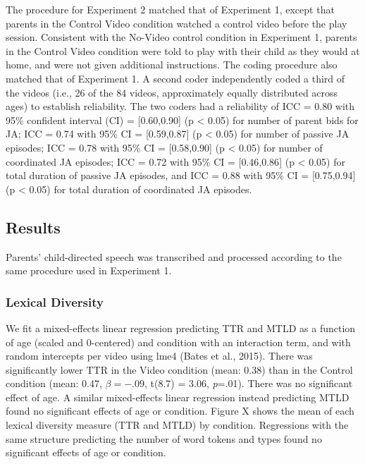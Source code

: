 \documentclass[]{article}
\begin{document}
The procedure for Experiment 2 matched that of Experiment 1, except that
parents in the Control Video condition watched a control video before
the play session. Consistent with the No-Video control condition in
Experiment 1, parents in the Control Video condition were told to play
with their child as they would at home, and were not given additional
instructions. The coding procedure also matched that of Experiment 1. A
second coder independently coded a third of the videos (i.e., 26 of the
84 videos, approximately equally distributed across ages) to establish
reliability. The two coders had a reliability of ICC = 0.80 with 95\%
confident interval (CI) = {[}0.60,0.90{]} (p \textless{} 0.05) for
number of parent bids for JA; ICC = 0.74 with 95\% CI = {[}0.59,0.87{]}
(p \textless{} 0.05) for number of passive JA episodes; ICC = 0.78 with
95\% CI = {[}0.58,0.90{]} (p \textless{} 0.05) for number of coordinated
JA episodes; ICC = 0.72 with 95\% CI = {[}0.46,0.86{]} (p \textless{}
0.05) for total duration of passive JA episodes, and ICC = 0.88 with
95\% CI = {[}0.75,0.94{]} (p \textless{} 0.05) for total duration of
coordinated JA episodes.

\hypertarget{results-1}{%
\subsection{Results}\label{results-1}}

Parents' child-directed speech was transcribed and processed according
to the same procedure used in Experiment 1.

\hypertarget{lexical-diversity-1}{%
\subsubsection{Lexical Diversity}\label{lexical-diversity-1}}

We fit a mixed-effects linear regression predicting TTR and MTLD as a
function of age (scaled and 0-centered) and condition with an
interaction term, and with random intercepts per video using lme4 (Bates
et al., 2015). There was significantly lower TTR in the Video condition
(mean: 0.38) than in the Control condition (mean: 0.47, \(\beta=-.09\),
t(8.7) = 3.06, \emph{p}=.01). There was no significant effect of age. A
similar mixed-effects linear regression instead predicting MTLD found no
significant effects of age or condition. Figure X shows the mean of each
lexical diversity measure (TTR and MTLD) by condition. Regressions with
the same structure predicting the number of word tokens and types found
no significant effects of age or condition.
\end{document}
